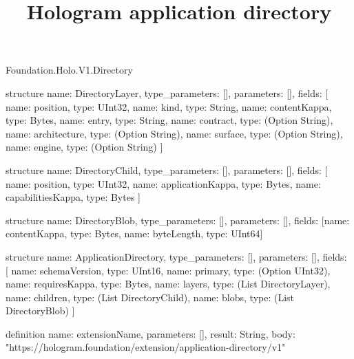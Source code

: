 \begin{lexlean}{Foundation.Holo.V1.Directory}
\title{Hologram application directory}
\begin{semanticmodule}
structure{
  name: DirectoryLayer,
  type_parameters: [],
  parameters: [],
  fields: [
    {name: position, type: UInt32},
    {name: kind, type: String},
    {name: contentKappa, type: Bytes},
    {name: entry, type: String},
    {name: contract, type: (Option String)},
    {name: architecture, type: (Option String)},
    {name: surface, type: (Option String)},
    {name: engine, type: (Option String)}
  ]
}

structure{
  name: DirectoryChild,
  type_parameters: [],
  parameters: [],
  fields: [
    {name: position, type: UInt32},
    {name: applicationKappa, type: Bytes},
    {name: capabilitiesKappa, type: Bytes}
  ]
}

structure{
  name: DirectoryBlob,
  type_parameters: [],
  parameters: [],
  fields: [{name: contentKappa, type: Bytes}, {name: byteLength, type: UInt64}]
}

structure{
  name: ApplicationDirectory,
  type_parameters: [],
  parameters: [],
  fields: [
    {name: schemaVersion, type: UInt16},
    {name: primary, type: (Option UInt32)},
    {name: requiresKappa, type: Bytes},
    {name: layers, type: (List DirectoryLayer)},
    {name: children, type: (List DirectoryChild)},
    {name: blobs, type: (List DirectoryBlob)}
  ]
}

definition{
  name: extensionName,
  parameters: [],
  result: String,
  body: "https://hologram.foundation/extension/application-directory/v1"
}
\end{semanticmodule}
\end{lexlean}
